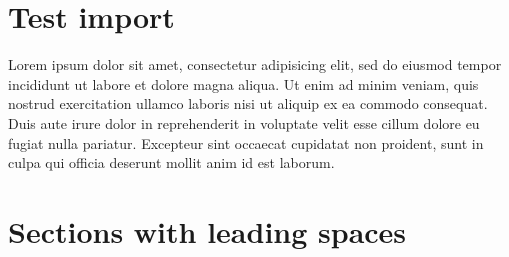 \chapter{Test import}

Lorem ipsum dolor sit amet, consectetur adipisicing elit, sed do eiusmod
tempor incididunt ut labore et dolore magna aliqua. Ut enim ad minim veniam,
quis nostrud exercitation ullamco laboris nisi ut aliquip ex ea commodo
consequat. Duis aute irure dolor in reprehenderit in voluptate velit esse
cillum dolore eu fugiat nulla pariatur. Excepteur sint occaecat cupidatat non
proident, sunt in culpa qui officia deserunt mollit anim id est laborum.


    \chapter{Sections with leading spaces}

